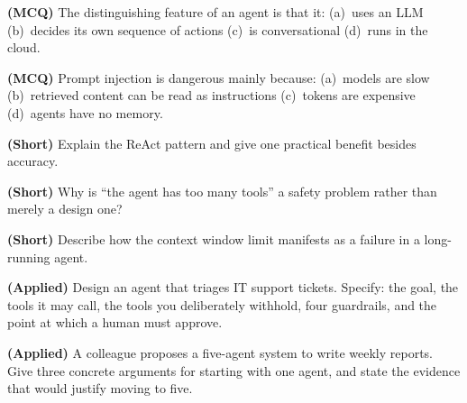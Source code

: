 \begin{reviewq}
  \item \textbf{(MCQ)} The distinguishing feature of an agent is that it:
        (a)~uses an LLM (b)~decides its own sequence of actions (c)~is
        conversational (d)~runs in the cloud.
  \item \textbf{(MCQ)} Prompt injection is dangerous mainly because: (a)~models are
        slow (b)~retrieved content can be read as instructions (c)~tokens are
        expensive (d)~agents have no memory.
  \item \textbf{(Short)} Explain the ReAct pattern and give one practical benefit
        besides accuracy.
  \item \textbf{(Short)} Why is ``the agent has too many tools'' a safety problem
        rather than merely a design one?
  \item \textbf{(Short)} Describe how the context window limit manifests as a
        failure in a long-running agent.
  \item \textbf{(Applied)} Design an agent that triages IT support tickets. Specify:
        the goal, the tools it may call, the tools you deliberately withhold, four
        guardrails, and the point at which a human must approve.
  \item \textbf{(Applied)} A colleague proposes a five-agent system to write weekly
        reports. Give three concrete arguments for starting with one agent, and state
        the evidence that would justify moving to five.
\end{reviewq}

